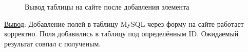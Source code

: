 \begin{figure}[p]
    \caption{Вывод таблицы на сайте после добавления элемента}
    \label{fig:site_table_after}
\end{figure}

\underline{Вывод}:
Добавление полей в таблицу MySQL через форму на сайте работает корректно. Поля добавились в таблицу под определённым ID. Ожидаемый результат совпал с полученым.

\newpage